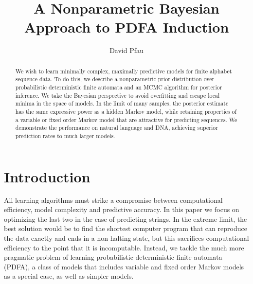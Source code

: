 \documentclass[11pt]{article}
\title{A Nonparametric Bayesian Approach to PDFA Induction}
\author{David Pfau}
\begin{document}
\maketitle

\begin{abstract}
We wish to learn minimally complex, maximally predictive models for finite alphabet sequence data.  To do this, we describe a nonparametric prior distribution over probabilistic deterministic finite automata and an MCMC algorithm for posterior inference.  We take the Bayesian perspective to avoid overfitting and escape local minima in the space of models.  In the limit of many samples, the posterior estimate has the same expressive power as a hidden Markov model, while retaining properties of a variable or fixed order Markov model that are attractive for predicting sequences.  We demonstrate the performance on natural language and DNA, achieving superior prediction rates to much larger models.
\end{abstract}

\section{Introduction}
All learning algorithms must strike a compromise between computational efficiency, model complexity and predictive accuracy.  In this paper we focus on optimizing the last two in the case of predicting strings.  In the extreme limit, the best solution would be to find the shortest computer program that can reproduce the data exactly and ends in a non-halting state, but this sacrifices computational efficiency to the point that it is incomputable.  Instead, we tackle the much more pragmatic problem of learning probabilistic deterministic finite automata (PDFA), a class of models that includes variable and fixed order Markov models as a special case, as well as simpler models.
\end{document}
